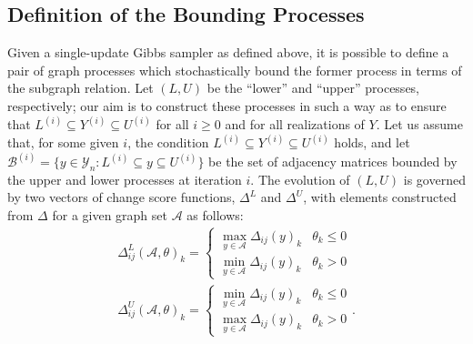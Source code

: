 \documentclass[11pt]{article}
\begin{document}
\subsection{Definition of the Bounding Processes}

Given a single-update Gibbs sampler as defined above, it is possible to define a pair of graph processes which stochastically bound the former process in terms of the subgraph relation.  Let $(L,U)$ be the ``lower'' and ``upper'' processes, respectively; our aim is to construct these processes in such a way as to ensure that $L^{(i)} \subseteq Y^{(i)} \subseteq U^{(i)}$ for all $i\ge 0$ and for all realizations of $Y$.  Let us assume that, for some given $i$, the condition $L^{(i)} \subseteq Y^{(i)} \subseteq U^{(i)}$ holds, and let $\mathcal{B}^{(i)}=\{y \in \mathcal{Y}_n: L^{(i)} \subseteq y \subseteq U^{(i)}\}$ be the set of adjacency matrices bounded by the upper and lower processes at iteration $i$.  The evolution of $(L,U)$ is governed by two vectors of change score functions, $\Delta^L$ and $\Delta^U$, with elements constructed from $\Delta$ for a given graph set $\mathcal{A}$ as follows:
\begin{gather}
\Delta^L_{ij}\left(\mathcal{A},\theta\right)_k = \begin{cases} \max_{y \in \mathcal{A}} \Delta_{ij}(y)_k& \theta_k \le 0\\ \min_{y \in \mathcal{A}} \Delta_{ij}(y)_k& \theta_k > 0\end{cases} \label{eq_deltal}\\
\Delta^U_{ij}\left(\mathcal{A},\theta\right)_k = \begin{cases} \min_{y \in \mathcal{A}} \Delta_{ij}(y)_k& \theta_k \le 0\\ \max_{y \in \mathcal{A}} \Delta_{ij}(y)_k& \theta_k > 0\end{cases}. \label{eq_deltau}
\end{gather}
\end{document}

